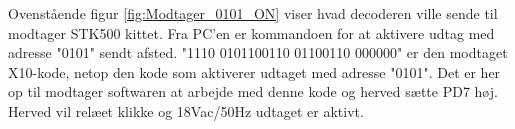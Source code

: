 Ovenstående figur \ref{fig:Modtager_0101_ON} viser hvad decoderen ville sende til modtager STK500 kittet. Fra PC'en er kommandoen for at aktivere udtag med adresse "0101" sendt afsted.
"1110 0101100110 01100110 000000" er den modtaget X10-kode, netop den kode som aktiverer udtaget med adresse "0101". Det er her op til modtager softwaren at arbejde med denne kode og herved sætte PD7 høj. Herved vil relæet klikke og 18Vac/50Hz udtaget er aktivt. 